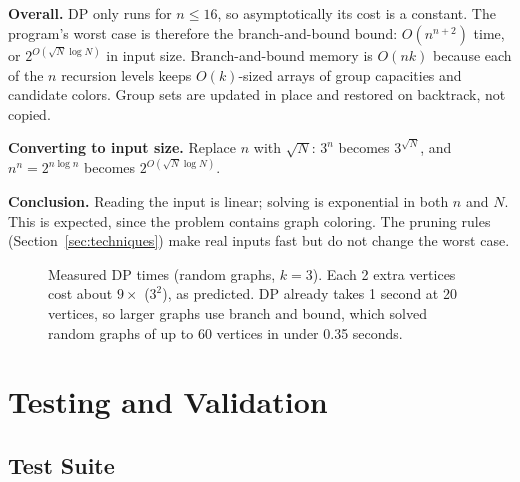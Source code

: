 \documentclass[11pt]{article}
\begin{document}
\textbf{Overall.} DP only runs for $n \le 16$, so asymptotically its cost
is a constant. The program's worst case is therefore the branch-and-bound
bound: $O(n^{n+2})$ time, or $2^{O(\sqrt N \log N)}$ in input size.
Branch-and-bound memory is $O(nk)$ because each of the $n$ recursion levels
keeps $O(k)$-sized arrays of group capacities and candidate colors. Group
sets are updated in place and restored on backtrack, not copied.

\textbf{Converting to input size.} Replace $n$ with $\sqrt N$: $3^n$ becomes
$3^{\sqrt N}$, and $n^n = 2^{n\log n}$ becomes $2^{O(\sqrt N \log N)}$.

\textbf{Conclusion.} Reading the input is linear; solving is exponential in
both $n$ and $N$. This is expected, since the problem contains graph
coloring. The pruning rules (Section~\ref{sec:techniques}) make real inputs
fast but do not change the worst case.

\begin{figure}[h]
\centering
{}
\caption{Measured DP times (random graphs, $k=3$). Each 2 extra vertices
cost about $9\times$ ($3^2$), as predicted. DP already takes 1 second at
20 vertices, so larger graphs use branch and bound, which solved random
graphs of up to 60 vertices in under 0.35 seconds.}
\end{figure}

\section{Testing and Validation}

\subsection{Test Suite}
\end{document}
